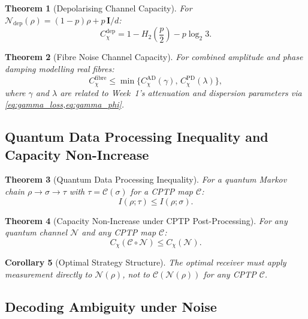 \documentclass[12pt,a4paper]{article}
\theoremstyle{definition}
\theoremstyle{plain}
\newtheorem{theorem}{Theorem}[section]
\newtheorem{corollary}[theorem]{Corollary}
\begin{document}
\begin{theorem}[Depolarising Channel Capacity]
For $\mathcal{N}_{\mathrm{dep}}(\rho)=(1-p)\rho+p\,\mathbf{I}/d$:
\begin{equation}
C_\chi^{\mathrm{dep}}=1-H_2\!\left(\frac{p}{2}\right)-p\log_2 3.
\end{equation}
\end{theorem}

\begin{theorem}[Fibre Noise Channel Capacity]
For combined amplitude and phase damping modelling real fibres:
\begin{equation}
C_\chi^{\mathrm{fibre}}\le\min\bigl\{C_\chi^{\mathrm{AD}}(\gamma),\,C_\chi^{\mathrm{PD}}(\lambda)\bigr\},
\end{equation}
where $\gamma$ and $\lambda$ are related to Week~1's attenuation and dispersion parameters
via \cref{eq:gamma_loss,eq:gamma_phi}.
\end{theorem}

\subsection{Quantum Data Processing Inequality and Capacity Non-Increase}

\begin{theorem}[Quantum Data Processing Inequality]
For a quantum Markov chain $\rho\to\sigma\to\tau$ with $\tau=\mathcal{C}(\sigma)$ for
a CPTP map $\mathcal{C}$:
\begin{equation}
I(\rho;\tau)\le I(\rho;\sigma).
\end{equation}
\end{theorem}

\begin{theorem}[Capacity Non-Increase under CPTP Post-Processing]
\label{thm:capacity_nonincrease}
For any quantum channel $\mathcal{N}$ and any CPTP map $\mathcal{C}$:
\begin{equation}
C_\chi(\mathcal{C}\circ\mathcal{N})\le C_\chi(\mathcal{N}).
\end{equation}
\end{theorem}

\begin{corollary}[Optimal Strategy Structure]
The optimal receiver must apply measurement directly to $\mathcal{N}(\rho)$, not to
$\mathcal{C}(\mathcal{N}(\rho))$ for any CPTP $\mathcal{C}$.
\end{corollary}

\subsection{Decoding Ambiguity under Noise}
\end{document}
